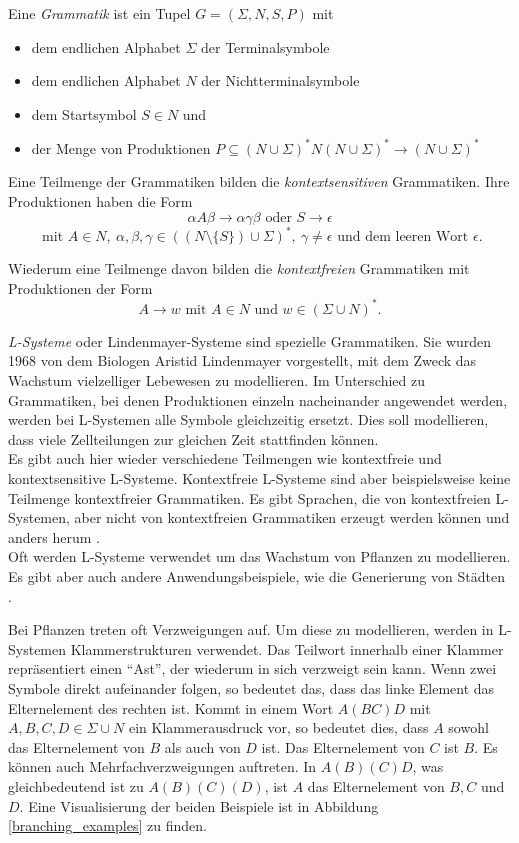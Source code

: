 Eine \emph{Grammatik} ist ein Tupel $G = (\Sigma, N, S, P)$ mit 
\begin{itemize}
 \item dem endlichen Alphabet $\Sigma$ der Terminalsymbole
 \item dem endlichen Alphabet $N$ der Nichtterminalsymbole
 \item dem Startsymbol $S \in N$ und
 \item der Menge von Produktionen $P \subseteq (N \cup \Sigma)^* N (N \cup \Sigma)^* \rightarrow (N \cup \Sigma)^*$
\end{itemize}

Eine Teilmenge der Grammatiken bilden die \emph{kontextsensitiven} Grammatiken. Ihre Produktionen haben die Form
\[\alpha A \beta \rightarrow \alpha \gamma \beta \text{ oder } S \rightarrow \epsilon\] \[\text{ mit } A \in N,~ \alpha, \beta, \gamma \in ((N \setminus \{ S \}) \cup \Sigma)^*,~ \gamma \neq \epsilon \text{ und dem leeren Wort } \epsilon.\]

Wiederum eine Teilmenge davon bilden die \emph{kontextfreien} Grammatiken mit Produktionen der Form 
\[A \rightarrow w \text{ mit } A \in N \text{ und } w \in (\Sigma \cup N)^*.\] \cite[Abschnitte 1.4 und 1.5]{FormalLanguageTheory}

\emph{L-Systeme} oder Lindenmayer-Systeme sind spezielle Grammatiken. Sie wurden 1968 von dem Biologen Aristid Lindenmayer vorgestellt, mit dem Zweck das Wachstum vielzelliger Lebewesen zu modellieren. Im Unterschied zu Grammatiken, bei denen Produktionen einzeln nacheinander angewendet werden, werden bei L-Systemen alle Symbole gleichzeitig ersetzt. Dies soll modellieren, dass viele Zellteilungen zur gleichen Zeit stattfinden können.\\
Es gibt auch hier wieder verschiedene Teilmengen wie \zb kontextfreie und kontextsensitive L-Systeme. Kontextfreie L-Systeme sind aber beispielsweise keine Teilmenge kontextfreier Grammatiken. Es gibt Sprachen, die von kontextfreien L-Systemen, aber nicht von kontextfreien Grammatiken erzeugt werden können und anders herum \cite[Abbildung 1.2]{AlgorithmicBeautyOfPlants}.\\
Oft werden L-Systeme verwendet um das Wachstum von Pflanzen zu modellieren. Es gibt aber auch andere Anwendungsbeispiele, wie \zb die Generierung von Städten \cite{cityGeneration}. 

Bei Pflanzen treten oft Verzweigungen auf. Um diese zu modellieren, werden in L-Systemen Klammerstrukturen verwendet. Das Teilwort innerhalb einer Klammer repräsentiert einen "`Ast"', der wiederum in sich verzweigt sein kann.
Wenn zwei Symbole direkt aufeinander folgen, so bedeutet das, dass das linke Element das Elternelement des rechten ist. Kommt in einem Wort $A(BC)D$ mit $A, B, C, D \in \Sigma \cup N$ ein Klammerausdruck vor, so bedeutet dies, dass $A$ sowohl das Elternelement von $B$ als auch von $D$ ist. Das Elternelement von $C$ ist $B$. Es können auch Mehrfachverzweigungen auftreten. In $A(B)(C)D$, was gleichbedeutend ist zu $A(B)(C)(D)$, ist $A$ das Elternelement von $B, C$ und $D$. Eine Visualisierung der beiden Beispiele ist in Abbildung \ref{branching_examples} zu finden. \cite[Kapitel 1]{AlgorithmicBeautyOfPlants}

